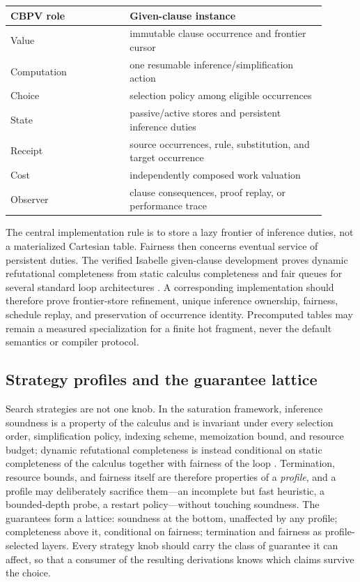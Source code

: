 \documentclass[11pt]{article}
\theoremstyle{definition}
\theoremstyle{remark}
\begin{document}
\begin{center}
\begin{tabular}{p{0.34\linewidth}p{0.56\linewidth}}
\toprule
CBPV role & Given-clause instance \\
\midrule
Value & immutable clause occurrence and frontier cursor \\
Computation & one resumable inference/simplification action \\
Choice & selection policy among eligible occurrences \\
State & passive/active stores and persistent inference duties \\
Receipt & source occurrences, rule, substitution, and target occurrence \\
Cost & independently composed work valuation \\
Observer & clause consequences, proof replay, or performance trace \\
\bottomrule
\end{tabular}
\end{center}

The central implementation rule is to store a lazy frontier of inference duties,
not a materialized Cartesian table.  Fairness then concerns eventual service of
persistent duties.  The verified Isabelle given-clause development proves dynamic
refutational completeness from static calculus completeness and fair queues for
several standard loop architectures \cite{GivenClauseAFP}.  A corresponding
implementation should therefore prove frontier-store refinement, unique
inference ownership, fairness, schedule replay, and preservation of occurrence
identity.  Precomputed tables may remain a measured specialization for a finite
hot fragment, never the default semantics or compiler protocol.

\subsection{Strategy profiles and the guarantee lattice}

Search strategies are not one knob.  In the saturation framework, inference
soundness is a property of the calculus and is invariant under every
selection order, simplification policy, indexing scheme, memoization bound,
and resource budget; dynamic refutational completeness is instead conditional
on static completeness of the calculus together with fairness of the loop
\cite{WaldmannSaturation,GivenClauseAFP}.  Termination, resource bounds, and
fairness itself are therefore properties of a \emph{profile}, and a profile
may deliberately sacrifice them---an incomplete but fast heuristic, a
bounded-depth probe, a restart policy---without touching soundness.  The
guarantees form a lattice: soundness at the bottom, unaffected by any profile;
completeness above it, conditional on fairness; termination and fairness as
profile-selected layers.  Every strategy knob should carry the class of
guarantee it can affect, so that a consumer of the resulting derivations knows
which claims survive the choice.
\end{document}
